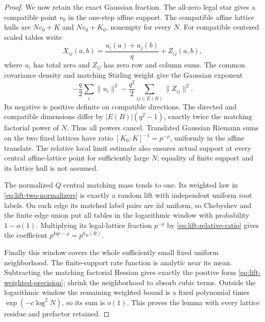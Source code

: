 \begin{proof}
We now retain the exact Gaussian fraction. The all-zero legal star
gives a compatible point $v_0$ in the one-step affine support.
The compatible affine lattice hulls are $Nv_0+K$ and $Nv_0+K_0$,
nonempty for every $N$. For compatible centered scaled tables write
\[
 X_{ij}(a,b)=\frac{u_i(a)+u_j(b)}q+Z_{ij}(a,b),
\]
where $u_i$ has total zero and $Z_{ij}$ has zero row and column sums.
The common covariance density and matching Stirling weight give
the Gaussian exponent
\begin{equation}\label{eq:lift-weighted-precision}
 -\frac q2\sum_i\|u_i\|^2
       -\frac{q^2}2\sum_{ij\in E(B)}\|Z_{ij}\|^2.
\end{equation}
Its negative is positive definite on compatible directions.
The directed and compatible dimensions differ by
$|E(B)|(q^2-1)$, exactly twice the matching factorial power of $N$.
Thus all powers cancel. Translated Gaussian Riemann sums on the
two fixed lattices have ratio $[K_0:K]^{-1}=p^{-\rho}$, uniformly
in the affine translate. The relative local limit estimate also
ensures actual support at every central affine-lattice point for
sufficiently large $N$; equality of finite support and its lattice
hull is not assumed.

The normalized $Q$ central matching mass tends to one. Its weighted
law in \eqref{eq:lift-two-normalizers} is exactly a random lift
with independent uniform root labels. On each edge its matched
label pairs are iid uniform, so Chebyshev and the finite edge union
put all tables in the logarithmic window with probability $1-o(1)$.
Multiplying its legal-lattice fraction $p^{-\rho}$ by
\eqref{eq:lift-relative-ratio} gives the coefficient
$p^{kqr-\rho}=p^{h_B(R)}$.

Finally this window covers the whole sufficiently small fixed
uniform neighborhood. The finite-support rate function is analytic
near its mean. Subtracting the matching factorial Hessian gives
exactly the positive form \eqref{eq:lift-weighted-precision}; shrink
the neighborhood to absorb cubic terms. Outside the logarithmic
window the remaining weighted bound is a fixed polynomial times
$\exp(-c\log^2N)$, so its sum is $o(1)$. This proves the lemma
with every lattice residue and prefactor retained.
\end{proof}

